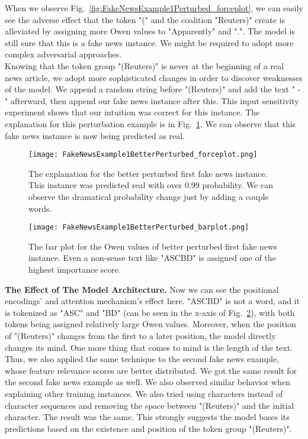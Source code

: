 When we observe Fig.~\ref{fig:FakeNewsExample1Perturbed_forceplot}, we can easily see the adverse effect that the token "(" and the coalition "Reuters)" create is alleviated by assigning more Owen values to "Apparently" and ".". The model is still sure that this is a fake news instance. We might be required to adopt more complex adversarial approaches.\\
Knowing that the token group "(Reuters)" is never at the beginning of a real news article, we adopt more sophisticated changes in order to discover weaknesses of the model. We append a random string before "(Reuters)" and add the text " - " afterward, then append our fake news instance after this. This input sensitivity experiment shows that our intuition was correct for this instance. The explanation for this perturbation example is in Fig.~\ref{fig:FakeNewsExample1BetterPerturbed_forceplot}. We can observe that this fake news instance is now being predicted as real.\\
\begin{figure}
    \centering
    \texttt{[image: FakeNewsExample1BetterPerturbed\_forceplot.png]}
    \caption[The explanation for the better perturbed first fake news instance.]{The explanation for the better perturbed first fake news instance. This instance was predicted real with over 0.99 probability. We can observe the dramatical probability change just by adding a couple words.}
    \label{fig:FakeNewsExample1BetterPerturbed_forceplot}
\end{figure}
\begin{figure}
    \centering
    \texttt{[image: FakeNewsExample1BetterPerturbed\_barplot.png]}
    \caption[The bar plot for the Owen values of better perturbed first fake news instance.]{The bar plot for the Owen values of better perturbed first fake news instance. Even a non-sense text like "ASCBD" is assigned one of the highest importance score.}
    \label{fig:FakeNewsExample1BetterPerturbed_barplot}
\end{figure}
\textbf{The Effect of The Model Architecture.} Now we can see the positional encodings' and attention mechanism's effect here. "ASCBD" is not a word, and it is tokenized as "ASC" and "BD" (can be seen in the x-axis of Fig.~\ref{fig:FakeNewsExample1BetterPerturbed_barplot}), with both tokens being assigned relatively large Owen values. Moreover, when the position of "(Reuters)" changes from the first to a later position, the model directly changes its mind. One more thing that comes to mind is the length of the text. Thus, we also applied the same technique to the second fake news example, whose feature relevance scores are better distributed. We got the same result for the second fake news example as well. We also observed similar behavior when explaining other training instances. We also tried using characters instead of character sequences and removing the space between "(Reuters)" and the initial character. The result was the same. This strongly suggests the model bases its predictions based on the existence and position of the token group "(Reuters)".\\
